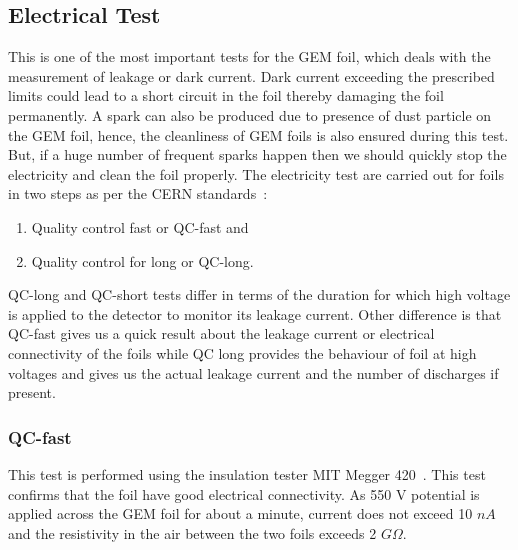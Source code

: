 \subsection{Electrical Test} %
\label{sub:electrical_test}
This is one of the most important tests for the GEM foil, which deals with the measurement of leakage or dark current.
Dark current exceeding the prescribed limits could lead to a short circuit in the foil thereby damaging the foil permanently.
A spark can also be produced due to presence of dust particle on the GEM foil, hence, the cleanliness of GEM foils is also ensured during this test.
But, if a huge number of frequent sparks happen then we should quickly stop the electricity and clean the foil properly.
The electricity test are carried out for foils in two steps as per the CERN standards~\cite{Abbaneo2015}:
\begin{enumerate}
    \item Quality control fast or QC-fast and
    \item Quality control for long or QC-long.
\end{enumerate}
QC-long and QC-short tests differ in terms of the duration for which high voltage is applied to the detector to monitor its leakage current.
Other difference is that QC-fast gives us a quick result about the leakage current or electrical connectivity of the foils while QC long provides the behaviour of foil at high voltages and gives us the actual leakage current and the number of discharges if present.
\subsubsection{QC-fast} %
\label{ssub:qc_fast}
This test is performed using the insulation tester MIT Megger 420~\cite{twelve}. This test confirms that the foil have good electrical connectivity. As 550 V potential is applied across the GEM foil for about a minute, current does not exceed 10 $nA$ and the resistivity in the air between the two foils exceeds 2 $G\Omega$.

